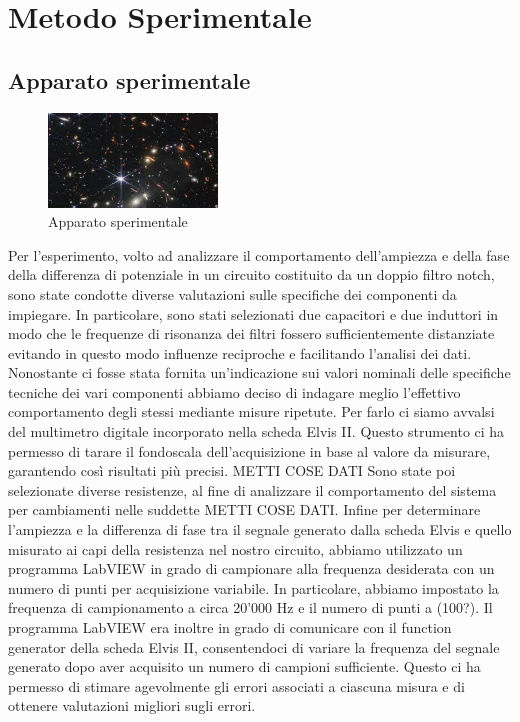 \documentclass[12pt, letterpaper]{article}
\begin{document}
\section{Metodo Sperimentale}
\subsection{Apparato sperimentale}
\begin{figure}
    \centering
    \includegraphics[width=0.4\textwidth]{apparato_sperimentale.jpeg}
    \caption{Apparato sperimentale}
    \label{fig:apparato}
\end{figure}

Per l'esperimento, volto ad analizzare il comportamento dell'ampiezza e della fase della differenza di potenziale in un circuito costituito da un doppio filtro notch,  sono state condotte diverse valutazioni sulle specifiche dei componenti da impiegare. In particolare, sono stati selezionati due capacitori e due induttori in modo che le frequenze di risonanza dei filtri fossero sufficientemente distanziate evitando in questo modo influenze reciproche e facilitando l’analisi dei dati. 
Nonostante ci fosse stata fornita un’indicazione sui valori nominali delle specifiche tecniche dei vari componenti abbiamo deciso di indagare meglio l’effettivo comportamento degli stessi mediante misure ripetute. Per farlo ci siamo avvalsi del multimetro digitale incorporato nella scheda Elvis II. Questo strumento ci ha permesso di tarare il fondoscala dell'acquisizione in base al valore da misurare, garantendo così risultati più precisi.
METTI COSE DATI
Sono state poi selezionate diverse resistenze, al fine di analizzare il comportamento del sistema per cambiamenti nelle suddette METTI COSE DATI.
Infine per determinare l'ampiezza e la differenza di fase tra il segnale generato dalla scheda Elvis e quello misurato ai capi della resistenza nel nostro circuito, abbiamo utilizzato un programma LabVIEW in grado di campionare alla frequenza desiderata con un numero di punti per acquisizione variabile. In particolare, abbiamo impostato la frequenza di campionamento a circa 20'000 Hz e il numero di punti a (100?).
Il programma LabVIEW era inoltre in grado di comunicare con il function generator della scheda Elvis II, consentendoci di variare la frequenza del segnale generato dopo aver acquisito un numero di campioni sufficiente. Questo ci ha permesso di stimare agevolmente gli errori associati a ciascuna misura e di ottenere valutazioni migliori sugli errori.
\end{document}
